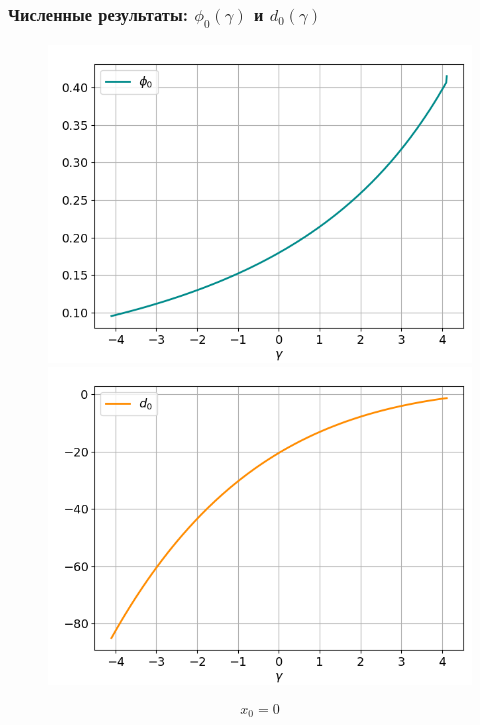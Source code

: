 \documentclass[fullscreen=true, unicode, bookmarks=false]{beamer}
\begin{document}
\begin{frame}
\frametitle{ Численные результаты: $ \phi_0(\gamma) $ и $ d_0(\gamma) $ }

\begin{figure} 
\includegraphics[scale=0.37]{oscillating_phi0_0.png}  
\hfill
\includegraphics[scale=0.37]{oscillating_d0_0.png}  
\end{figure}

$$ x_0 = 0 $$

\end{frame}
\end{document}
